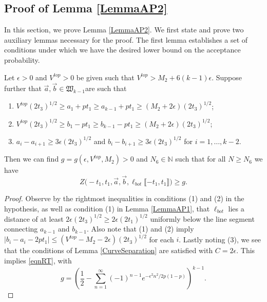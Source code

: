 \subsection{Proof of Lemma \ref{LemmaAP2}} \label{sect62} In this section, we prove Lemma \ref{LemmaAP2}. We first state and prove two auxiliary lemmas necessary for the proof. The first lemma establishes a set of conditions under which we have the desired lower bound on the acceptance probability. 

\begin{lemma}\label{LemmaBP1} Let $\epsilon > 0$ and $V^{top} > 0$ be given such that $V^{top} > M_2 + 6 (k-1) \epsilon$. Suppose further that $\vec{a}, \vec{b} \in \mathfrak{W}_{k-1}$are such that 
	\begin{enumerate}
		\item $V^{top} (2t_3)^{1/2} \geq a_1 + p t_1 \geq a_{k-1} + pt_1 \geq (M_2 + 2 \epsilon) (2t_3)^{1/2}$;
		\item $V^{top} (2t_3)^{1/2} \geq b_1 - p t_1 \geq b_{k-1} - pt_1 \geq (M_2 + 2 \epsilon) (2t_3)^{1/2}$; 
		\item $a_i -a_{i+1} \geq 3\epsilon (2t_3)^{1/2}$ and $b_{i} - b_{i+1} \geq 3 \epsilon (2t_3)^{1/2}$ for $i = 1, \dots, k-2$.
	\end{enumerate}
	Then we can find $g = g(\epsilon, V^{top}, M_2) > 0$ and $N_6 \in \mathbb{N}$ such that for all $N \geq N_6$ we have 
	\begin{equation}\label{eqnRT}
	Z\big(  -t_1, t_1, \vec{a} ,\vec{b}, \ell_{bot}\llbracket -t_1, t_1\rrbracket\big) \geq g.
	\end{equation}
\end{lemma}

\begin{proof}
	
	Observe by the rightmost inequalities in conditions (1) and (2) in the hypothesis, as well as condition (1) in Lemma \ref{LemmaAP1}, that $\ell_{bot}$ lies a distance of at least $2\epsilon(2t_3)^{1/2} \geq 2\epsilon(2t_1)^{1/2}$ uniformly below the line segment connecting $a_{k-1}$ and $b_{k-1}$. Also note that (1) and (2) imply $|b_i-a_i-2pt_1| \leq (V^{top} - M_2-2\epsilon)(2t_3)^{1/2}$ for each $i$. Lastly noting (3), we see that the conditions of Lemma \ref{CurveSeparation} are satisfied with $C = 2\epsilon$. This implies \eqref{eqnRT}, with
	\[
	g = \left( \frac{1}{2} - \sum_{n=1}^\infty (-1)^{n-1} e^{-\epsilon^2n^2/2p(1-p)}\right)^{k-1}.
	\]
	
\end{proof}


